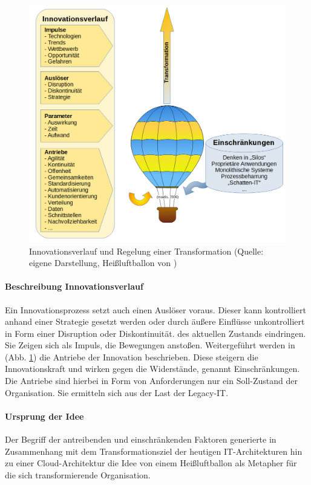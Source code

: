 \begin{figure}[htbp]
 \centering
 \includegraphics[width=1.0\textwidth]{gfx/digital-transformation-lifecycle-by-selim3.PNG}
 \caption{Innovationsverlauf und Regelung einer Transformation (Quelle: eigene Darstellung, Heißluftballon von \citet{maidis_2006})\label{fig:digit-trans}
 }
\end{figure}
%
\paragraph{Beschreibung Innovationsverlauf}
Ein Innovationsprozess setzt auch einen Auslöser voraus. Dieser kann kontrolliert anhand einer Strategie gesetzt werden oder durch äußere Einflüsse unkontrolliert in Form einer Disruption oder Diskontinuität. \cite{Fernandez:2020} des aktuellen Zustands eindringen. Sie Zeigen sich als Impuls, die Bewegungen anstoßen.
Weitergeführt werden in (Abb. \ref{fig:digit-trans}) die Antriebe der Innovation beschrieben. Diese steigern die Innovationskraft und wirken gegen die Widerstände, genannt Einschränkungen. Die Antriebe sind hierbei in Form von Anforderungen nur ein Soll-Zustand der Organisation. Sie ermitteln sich aus der Last der Legacy-IT. 

\paragraph{Ursprung der Idee}
Der Begriff der antreibenden und einschränkenden Faktoren generierte in Zusammenhang mit dem Transformationsziel der heutigen IT-Architekturen hin zu einer Cloud-Architektur die Idee von einem Heißluftballon als Metapher für die sich transformierende Organisation.

